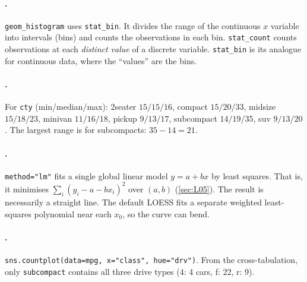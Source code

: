 \paragraph{.}
\texttt{geom\_histogram} uses \texttt{stat\_bin}. It divides the range of the continuous $x$
variable into intervals (bins) and counts the observations in each bin. \texttt{stat\_count} counts
observations at each \emph{distinct value} of a discrete variable. \texttt{stat\_bin} is its
analogue for continuous data, where the ``values'' are the bins.

\paragraph{.}
For \texttt{cty} (min/median/max): 2seater $15/15/16$, compact $15/20/33$, midsize $15/18/23$,
minivan $11/16/18$, pickup $9/13/17$, subcompact $14/19/35$, suv $9/13/20$. The largest range is
for subcompacts: $35-14=21$.

\paragraph{.}
\texttt{method="lm"} fits a single global linear model $y=a+bx$ by least squares. That is, it
minimises $\sum_i (y_i-a-bx_i)^2$ over $(a,b)$ (\cref{sec:L05}). The result is necessarily a
straight line. The default LOESS fits a separate weighted least-squares polynomial near each
$x_0$, so the curve can bend.

\paragraph{.}
\texttt{sns.countplot(data=mpg, x="class", hue="drv")}. From the cross-tabulation, only
\texttt{subcompact} contains all three drive types ($4$: 4 cars, f: 22, r: 9).

